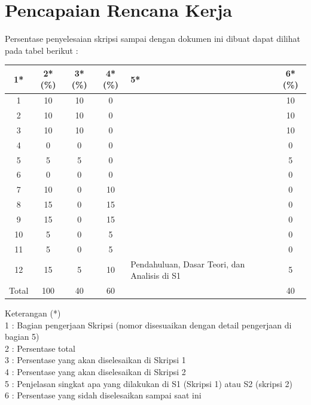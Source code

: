 \documentclass[a4paper,twoside]{article}
\begin{document}
\section{Pencapaian Rencana Kerja}
Persentase penyelesaian skripsi sampai dengan dokumen ini dibuat dapat dilihat pada tabel berikut :

\begin{center}
  \begin{tabular}{ | c | c | c | c | l | c |}
    \hline
    1* & 2*(\%) & 3*(\%) & 4*(\%) & 5* & 6*(\%) \\ \hline \hline
    1 & 10 & 10 & 0 & & 10 \\ \hline
    2 & 10 & 10 & 0 & & 10 \\ \hline
    3 & 10 & 10 & 0 & & 10 \\ \hline
    4 & 0 & 0 & 0 & & 0 \\ \hline
    5 & 5 & 5 & 0 & & 5 \\ \hline
    6 & 0 & 0 & 0 & & 0 \\ \hline
    7 & 10 & 0 & 10 & & 0 \\ \hline
    8 & 15 & 0 & 15 & & 0 \\ \hline
    9 & 15 & 0 & 15 & & 0 \\ \hline
    10 & 5 & 0 & 5 & & 0 \\ \hline
    11 & 5 & 0 & 5 & & 0 \\ \hline
    12 & 15 & 5 & 10 & {\footnotesize Pendahuluan, Dasar Teori, dan Analisis di S1} & 5 \\ \hline
    Total & 100 & 40 & 60 & & 40 \\ \hline
	\end{tabular}
\end{center}

Keterangan (*)\\
1 : Bagian pengerjaan Skripsi (nomor disesuaikan dengan detail pengerjaan di bagian 5)\\
2 : Persentase total \\
3 : Persentase yang akan diselesaikan di Skripsi 1 \\
4 : Persentase yang akan diselesaikan di Skripsi 2 \\
5 : Penjelasan singkat apa yang dilakukan di S1 (Skripsi 1) atau S2 (skripsi 2)\\
6 : Persentase yang sidah diselesaikan sampai saat ini

\clearpage
\end{document}
